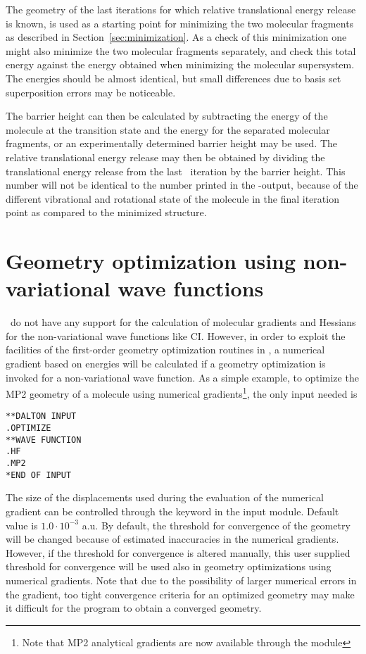 The geometry of the last iterations for which relative translational
energy release is known, is used as a starting point for minimizing
the two molecular fragments as described in
Section~\ref{sec:minimization}. As a check of this minimization one
might also minimize the two molecular fragments separately, and check
this total energy against the energy obtained when minimizing the
molecular supersystem. The energies should be almost identical, but
small differences due to basis set superposition errors may be
noticeable.

The barrier height can then be calculated by subtracting the energy of
the molecule at the transition state and the energy for the separated
molecular fragments, or an experimentally determined barrier height
may be used. The relative translational energy release may then be
obtained  by dividing the translational energy release
from the last \dalton\ iteration by the barrier height. This number will
not be identical to the number printed in the \dalton -output, because
of the different vibrational and rotational state of
the molecule in the final iteration point as compared to the minimized
structure.

\section{Geometry optimization using non-variational wave
functions}\label{sec:nonvargeom}

\dalton\ do not have any support for the calculation of molecular
gradients and Hessians for the non-variational wave functions like
CI. However, in order to
exploit the facilities of the first-order
geometry optimization routines in {\dalton}, a numerical
gradient based
on energies will be calculated if a geometry optimization is invoked
for a non-variational wave function. As a simple example, to optimize
the MP2 geometry of a molecule using numerical gradients\footnote{Note
that MP2 analytical gradients are now available through the {\cc}
module}, the only input needed is

\begin{verbatim}
**DALTON INPUT
.OPTIMIZE
**WAVE FUNCTION
.HF
.MP2
*END OF INPUT
\end{verbatim}

The size of the displacements used during the evaluation of the
numerical gradient can be controlled through the keyword
 in the  input module. Default value is
$1.0\cdot 10^{-3}$ a.u. By default, the threshold for convergence
of the geometry will be changed because of estimated inaccuracies
in the numerical gradients. However, if the threshold for
convergence is altered manually, this user supplied threshold for
convergence will be used also in geometry optimizations using
numerical gradients. Note that due to
the possibility of larger numerical errors in the gradient, too
tight convergence criteria for an optimized geometry may make it
difficult for the program to obtain a converged geometry.
